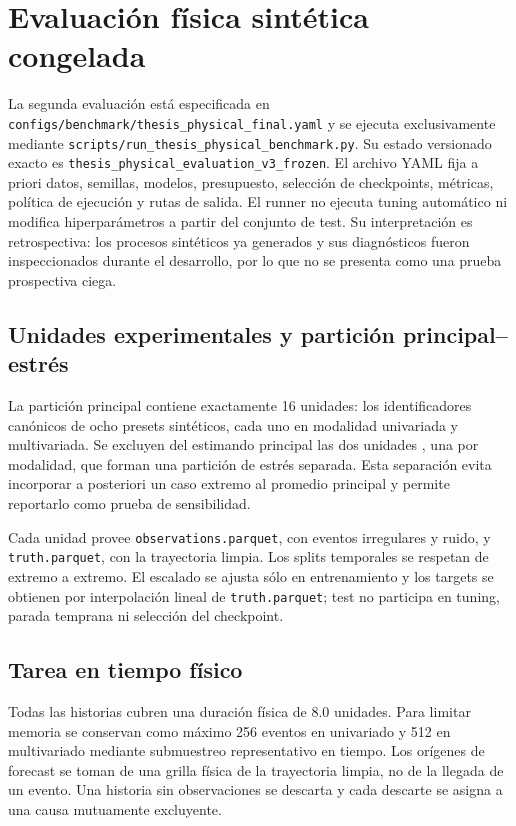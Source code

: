 \section{Evaluación física sintética congelada}
\label{sec:benchmark-fisico}

La segunda evaluación está especificada en \nolinkurl{configs/benchmark/thesis_physical_final.yaml} y se ejecuta exclusivamente mediante \nolinkurl{scripts/run_thesis_physical_benchmark.py}. Su estado versionado exacto es \nolinkurl{thesis_physical_evaluation_v3_frozen}. El archivo YAML fija a priori datos, semillas, modelos, presupuesto, selección de checkpoints, métricas, política de ejecución y rutas de salida. El runner no ejecuta tuning automático ni modifica hiperparámetros a partir del conjunto de test. Su interpretación es retrospectiva: los procesos sintéticos ya generados y sus diagnósticos fueron inspeccionados durante el desarrollo, por lo que no se presenta como una prueba prospectiva ciega.

\subsection{Unidades experimentales y partición principal--estrés}

La partición principal contiene exactamente 16 unidades: los identificadores canónicos  de ocho presets sintéticos, cada uno en modalidad univariada y multivariada. Se excluyen del estimando principal las dos unidades , una por modalidad, que forman una partición de estrés separada. Esta separación evita incorporar a posteriori un caso extremo al promedio principal y permite reportarlo como prueba de sensibilidad.

Cada unidad provee \nolinkurl{observations.parquet}, con eventos irregulares y ruido, y \nolinkurl{truth.parquet}, con la trayectoria limpia. Los splits temporales se respetan de extremo a extremo. El escalado se ajusta sólo en entrenamiento y los targets se obtienen por interpolación lineal de \nolinkurl{truth.parquet}; test no participa en tuning, parada temprana ni selección del checkpoint.

\subsection{Tarea en tiempo físico}

Todas las historias cubren una duración física de 8.0 unidades. Para limitar memoria se conservan como máximo 256 eventos en univariado y 512 en multivariado mediante submuestreo representativo en tiempo. Los orígenes de forecast se toman de una grilla física de la trayectoria limpia, no de la llegada de un evento. Una historia sin observaciones se descarta y cada descarte se asigna a una causa mutuamente excluyente.

